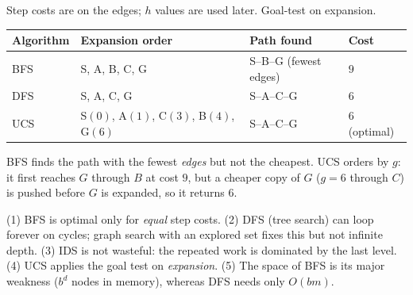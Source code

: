 \documentclass[11pt,a4paper]{article}
\begin{document}
\begin{center}
\end{center}
\begin{example}
Step costs are on the edges; $h$ values are used later. Goal-test on expansion.
\begin{center}
\small
\begin{tabularx}{\textwidth}{>{\raggedright\arraybackslash}p{2.4cm}>{\raggedright\arraybackslash}p{4.3cm}>{\raggedright\arraybackslash}p{3.7cm}>{\raggedright\arraybackslash}X}
\toprule
\textbf{Algorithm} & \textbf{Expansion order} & \textbf{Path found} & \textbf{Cost}\\
\midrule
BFS & S, A, B, C, G & S--B--G (fewest edges) & $9$\\
DFS & S, A, C, G & S--A--C--G & $6$\\
UCS & S$(0)$, A$(1)$, C$(3)$, B$(4)$, G$(6)$ & S--A--C--G & $6$ (optimal)\\
\bottomrule
\end{tabularx}
\end{center}
BFS finds the path with the fewest \emph{edges} but not the cheapest. UCS orders by $g$: it first reaches $G$ through $B$ at cost $9$, but a cheaper copy of $G$ ($g=6$ through $C$) is pushed before $G$ is expanded, so it returns $6$.
\end{example}
\begin{trap}
(1) BFS is optimal only for \emph{equal} step costs. (2) DFS (tree search) can loop forever on cycles; graph search with an explored set fixes this but not infinite depth. (3) IDS is not wasteful: the repeated work is dominated by the last level. (4) UCS applies the goal test on \emph{expansion}. (5) The space of BFS is its major weakness ($b^d$ nodes in memory), whereas DFS needs only $O(bm)$.
\end{trap}
\end{document}
